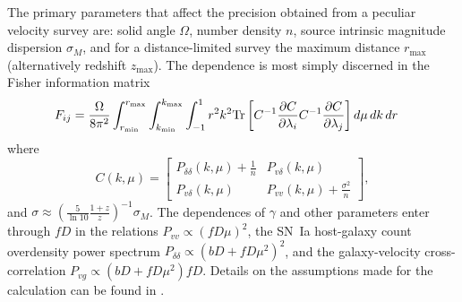 \documentclass[11pt, oneside]{article}   	%
\begin{document}
The primary  parameters that affect the precision obtained from a peculiar velocity survey are: solid angle $\Omega$, number density $n$, source intrinsic
magnitude dispersion $\sigma_M$, and for a distance-limited survey the maximum distance $r_{\text{max}}$ (alternatively redshift $z_{\text{max}}$).
The dependence is most simply discerned 
in the  Fisher information matrix
\begin{align}
F_{ij} 
& = \frac{\Omega}{8\pi^2} \int_{r_{\rm min}}^{r_{\rm max}}  \int_{k_{\rm min}}^{k_{\rm max}}  \int_{-1}^{1} r^2 k^2 \text{Tr}\left[ C^{-1} \frac{\partial C}{\partial \lambda_i} C^{-1}
\frac{\partial C}{\partial \lambda_j} \right] d\mu\,dk\,dr
\label{fisher:eqn}
\end{align}
where
\begin{equation}
C(k,\mu)  =
  \begin{bmatrix}
   P_{\delta \delta}(k,\mu) + \frac{1}{n} &
   P_{v\delta}(k,\mu)  \\
   P_{v\delta}(k,\mu)  &
  P_{vv}(k,\mu) + \frac{\sigma^2}{n}
   \end{bmatrix},
\label{cov:eq}
\end{equation}
and $\sigma \approx (\frac{5}{\ln{10}} \frac{1+z}{z})^{-1} \sigma_M$.
The dependences of $\gamma$ and other parameters enter through $fD$ in the relations $P_{vv}\propto (fD\mu)^2$, the SN~Ia host-galaxy count overdensity
power spectrum $P_{\delta \delta }\propto (bD + fD\mu^2)^2$, and the galaxy-velocity cross-correlation $P_{vg}
\propto  (bD + fD\mu^2)fD$.  Details
on the assumptions made for the calculation can be found in \cite{2019BAAS...51c.140K}.
\end{document}
